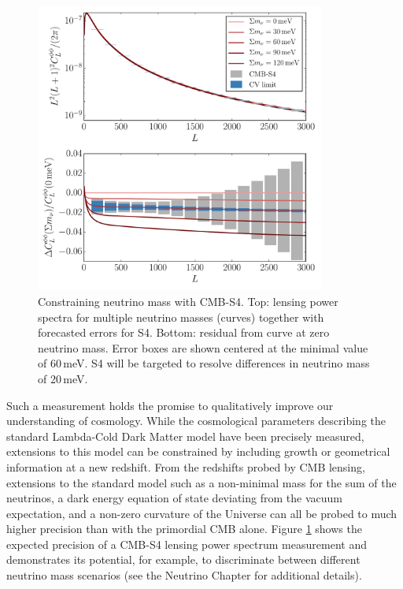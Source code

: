 \begin{figure}[htbp]
\centering
\includegraphics[width=0.85\textwidth]{CMBLensing/mnuS4errors.pdf}
\caption{Constraining neutrino mass with CMB-S4.  Top: lensing power spectra for multiple neutrino masses (curves) together with forecasted errors for S4.  Bottom: residual from curve at zero neutrino mass.  Error boxes are shown centered at the minimal value of $60$\,meV.  S4 will be targeted to resolve differences in neutrino mass of 20\,meV. }
\label{mnuS4errors}
\end{figure}

Such a measurement holds the promise to qualitatively improve our understanding of cosmology.  While the cosmological parameters describing the standard Lambda-Cold Dark Matter model have been precisely measured, extensions to this model can be constrained by including growth or geometrical information at a new redshift.  From the redshifts probed by CMB lensing, extensions to the standard model such as a non-minimal mass for the sum of the neutrinos, a dark energy equation of state deviating from the vacuum expectation, and a non-zero curvature of the Universe can all be probed to much higher precision than with the primordial CMB alone. Figure \ref{mnuS4errors} shows the expected precision of a CMB-S4 lensing power spectrum measurement and demonstrates its potential, for example, to discriminate between different neutrino mass scenarios (see the Neutrino Chapter for additional details). 



